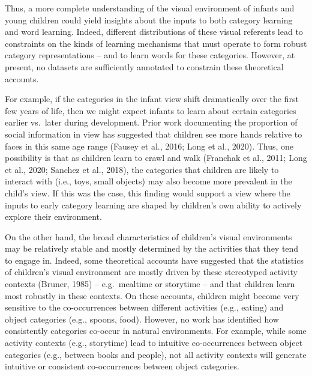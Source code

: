 \documentclass[10pt, letterpaper]{article}
\begin{document}
Thus, a more complete understanding of the visual environment of infants
and young children could yield insights about the inputs to both
category learning and word learning. Indeed, different distributions of
these visual referents lead to constraints on the kinds of learning
mechanisms that must operate to form robust category representations --
and to learn words for these categories. However, at present, no
datasets are sufficiently annotated to constrain these theoretical
accounts.

For example, if the categories in the infant view shift dramatically
over the first few years of life, then we might expect infants to learn
about certain categories earlier vs.~later during development. Prior
work documenting the proportion of social information in view has
suggested that children see more hands relative to faces in this same
age range (Fausey et al., 2016; Long et al., 2020). Thus, one
possibility is that as children learn to crawl and walk (Franchak et
al., 2011; Long et al., 2020; Sanchez et al., 2018), the categories that
children are likely to interact with (i.e., toys, small objects) may
also become more prevalent in the child's view. If this was the case,
this finding would support a view where the inputs to early category
learning are shaped by children's own ability to actively explore their
environment.

On the other hand, the broad characteristics of children's visual
environments may be relatively stable and mostly determined by the
activities that they tend to engage in. Indeed, some theoretical
accounts have suggested that the statistics of children's visual
environment are mostly driven by these stereotyped activity contexts
(Bruner, 1985) -- e.g.~mealtime or storytime -- and that children learn
most robustly in these contexts. On these accounts, children might
become very sensitive to the co-occurrences between different activities
(e.g., eating) and object categories (e.g., spoons, food). However, no
work has identified how consistently categories co-occur in natural
environments. For example, while some activity contexts (e.g.,
storytime) lead to intuitive co-occurrences between object categories
(e.g., between books and people), not all activity contexts will
generate intuitive or consistent co-occurrences between object
categories.
\end{document}

